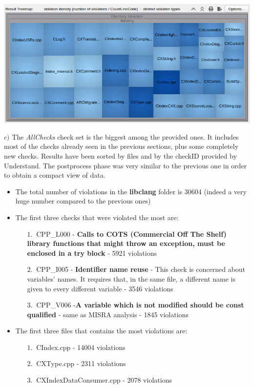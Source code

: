 \begin{minipage}{\linewidth}
	\includegraphics[width=\textwidth]{img/SciToolsViolationsRatio.png}
\end{minipage}

\pagebreak

\hspace{-0.6cm} \textbf{$c)$}  
The \textsl{AllChecks} check set is the biggest among the provided ones. It includes most of the checks already seen in the previous sections, plus some completely new checks.\newline
Results have been sorted by files and by the checkID provided by Understand. The postprocess phase was very similar to the previous one in order to obtain a compact view of data.\newline

\begin{itemize}
	\item The total number of violations in the \textbf{libclang} folder is 30604 (indeed a very huge number compared to the previous ones)
	\item The first three checks that were violated the most are:
	\begin{itemize}
		\item[$1.\:$] CPP\_L000 - \textbf{Calls to COTS (Commercial Off The Shelf) library functions that might throw an exception, must be enclosed in a try block} - 5921 violations
		\item[$2.\:$] CPP\_I005 - \textbf{Identifier name reuse} - This check is concerned about variables' names. It requires that, in the same file, a different name is given to every different variable - 3546 violations
		\item[$3.\:$] CPP\_V006 -\textbf{A variable which is not modified should be const qualified} - same as MISRA analysis - 1845 violations
	\end{itemize}
	\item The first three files that contains the most violations are:
		\begin{itemize}
		\item[$1.\:$] CIndex.cpp - 14004 violations
		\item[$2.\:$] CXType.cpp - 2311 violations
		\item[$3.\:$] CXIndexDataConsumer.cpp - 2078 violations
	\end{itemize}
\end{itemize}

